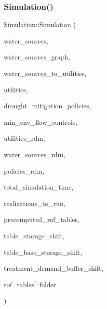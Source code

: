 \subsubsection{\texorpdfstring{Simulation()}{Simulation()}\hspace{0.1cm}{\footnotesize\ttfamily [2/3]}}
{\footnotesize\ttfamily Simulation\+::\+Simulation (\begin{DoxyParamCaption}\item[{vector$<$ \mbox{\hyperlink{classWaterSource}{Water\+Source}} $\ast$$>$ \&}]{water\+\_\+sources,  }\item[{\mbox{\hyperlink{classGraph}{Graph}} \&}]{water\+\_\+sources\+\_\+graph,  }\item[{const vector$<$ vector$<$ int $>$$>$ \&}]{water\+\_\+sources\+\_\+to\+\_\+utilities,  }\item[{vector$<$ \mbox{\hyperlink{classUtility}{Utility}} $\ast$$>$ \&}]{utilities,  }\item[{const vector$<$ \mbox{\hyperlink{classDroughtMitigationPolicy}{Drought\+Mitigation\+Policy}} $\ast$$>$ \&}]{drought\+\_\+mitigation\+\_\+policies,  }\item[{vector$<$ \mbox{\hyperlink{classMinEnvFlowControl}{Min\+Env\+Flow\+Control}} $\ast$$>$ \&}]{min\+\_\+env\+\_\+flow\+\_\+controls,  }\item[{vector$<$ vector$<$ double $>$$>$ \&}]{utilities\+\_\+rdm,  }\item[{vector$<$ vector$<$ double $>$$>$ \&}]{water\+\_\+sources\+\_\+rdm,  }\item[{vector$<$ vector$<$ double $>$$>$ \&}]{policies\+\_\+rdm,  }\item[{const unsigned long}]{total\+\_\+simulation\+\_\+time,  }\item[{vector$<$ unsigned long $>$ \&}]{realizations\+\_\+to\+\_\+run,  }\item[{vector$<$ vector$<$ \mbox{\hyperlink{classMatrix2D}{Matrix2D}}$<$ double $>$$>$$>$ \&}]{precomputed\+\_\+rof\+\_\+tables,  }\item[{vector$<$ vector$<$ double $>$$>$ \&}]{table\+\_\+storage\+\_\+shift,  }\item[{vector$<$ vector$<$ double $>$$>$ \&}]{table\+\_\+base\+\_\+storage\+\_\+shift,  }\item[{vector$<$ vector$<$ double $>$$>$ \&}]{treatment\+\_\+demand\+\_\+buffer\+\_\+shift,  }\item[{string \&}]{rof\+\_\+tables\+\_\+folder }\end{DoxyParamCaption})}



